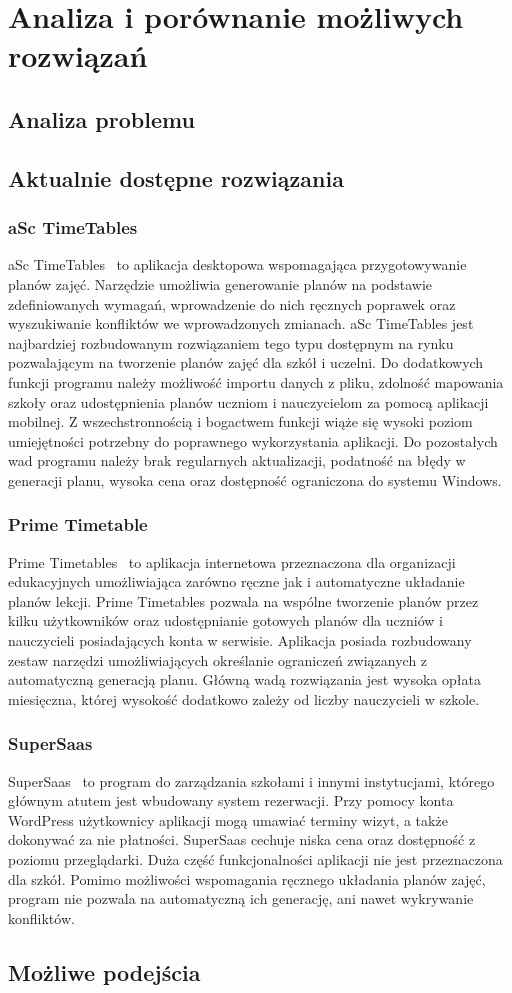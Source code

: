 
\chapter{Analiza i porównanie możliwych rozwiązań}
\section{Analiza problemu}
\section{Aktualnie dostępne rozwiązania}
\subsection{aSc TimeTables}
aSc TimeTables~\cite{asc} to aplikacja desktopowa wspomagająca przygotowywanie planów zajęć. Narzędzie umożliwia generowanie planów na podstawie zdefiniowanych wymagań, wprowadzenie do nich ręcznych poprawek oraz wyszukiwanie konfliktów we wprowadzonych zmianach. aSc TimeTables jest najbardziej rozbudowanym rozwiązaniem tego typu dostępnym na rynku pozwalającym na tworzenie planów zajęć dla szkół i uczelni. Do dodatkowych funkcji programu należy możliwość importu danych z pliku, zdolność mapowania szkoły oraz udostępnienia planów uczniom i nauczycielom za pomocą aplikacji mobilnej. Z wszechstronnością i bogactwem funkcji wiąże się wysoki poziom umiejętności potrzebny do poprawnego wykorzystania aplikacji. Do pozostałych wad programu należy brak regularnych aktualizacji, podatność na błędy w generacji planu, wysoka cena oraz dostępność ograniczona do systemu Windows.
\subsection{Prime Timetable}
Prime Timetables~\cite{prime} to aplikacja internetowa przeznaczona dla organizacji edukacyjnych umożliwiająca zarówno ręczne jak i automatyczne układanie planów lekcji. Prime Timetables pozwala na wspólne tworzenie planów przez kilku użytkowników oraz udostępnianie gotowych planów dla uczniów i nauczycieli posiadających konta w serwisie. Aplikacja posiada rozbudowany zestaw narzędzi umożliwiających określanie ograniczeń związanych z automatyczną generacją planu. Główną wadą rozwiązania jest wysoka opłata miesięczna, której wysokość dodatkowo zależy od liczby nauczycieli w szkole. 
\subsection{SuperSaas}
SuperSaas~\cite{saas} to program do zarządzania szkołami i innymi instytucjami, którego głównym atutem jest wbudowany system rezerwacji. Przy pomocy konta WordPress użytkownicy aplikacji mogą umawiać terminy wizyt, a także dokonywać za nie płatności. SuperSaas cechuje niska cena oraz dostępność z poziomu przeglądarki. Duża część funkcjonalności aplikacji nie jest przeznaczona dla szkół. Pomimo możliwości wspomagania ręcznego układania planów zajęć, program nie pozwala na automatyczną ich generację, ani nawet wykrywanie konfliktów. 
\section{Możliwe podejścia}